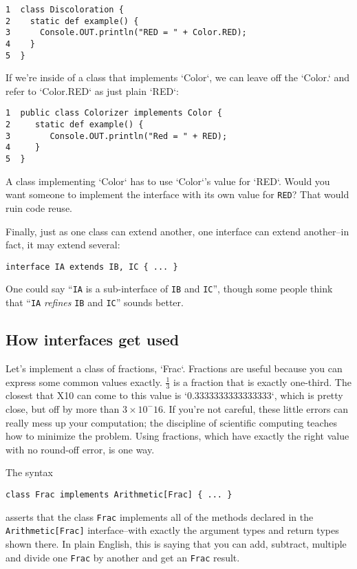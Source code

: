 \begin{description}
\begin{verbatim}
1  class Discoloration {
2    static def example() {
3      Console.OUT.println("RED = " + Color.RED);
4    }
5  }
\end{verbatim}

If we're inside of a class that implements \xcd`Color`, we can leave off the
\xcd`Color.` and refer to \xcd`Color.RED` as just plain \xcd`RED`:

\begin{verbatim}
1  public class Colorizer implements Color {
2     static def example() {
3        Console.OUT.println("Red = " + RED); 
4     }
5  }
\end{verbatim}

A class implementing \xcd`Color` has to use \xcd`Color`'s value for \xcd`RED`.  
Would you 
want someone to implement the interface with its own value for {\tt RED}? That
would ruin code reuse. 


\end{description}

Finally, just as one class can extend another, one interface can extend another--in fact, it may
extend several:
\begin{verbatim}
interface IA extends IB, IC { ... }
\end{verbatim}
One could
say ``{\tt IA} is a sub-interface of {\tt IB} and {\tt IC}'', though some
people think that 
``{\tt IA} {\em refines} {\tt IB} and {\tt IC}'' sounds better. 

\subsection{How interfaces get used}

Let's implement a class of fractions, \xcd`Frac`.  Fractions are useful
because you can express some common values exactly.  {$\frac{1}{3}$} is a
fraction that is exactly one-third.  The 
closest that X10 can come to this value is 
\xcd`0.3333333333333333`, which is pretty close, but off by more than
{$3\times 10^-16$}.  If you're not careful, these little errors can really
mess up your computation; the discipline of scientific computing teaches how
to minimize the problem.  Using fractions, which have exactly the right value
with no round-off error, is one way.

The syntax 
\begin{verbatim}
class Frac implements Arithmetic[Frac] { ... }
\end{verbatim}
asserts that the class {\tt Frac} implements all of the methods 
declared in the {\tt Arith\-me\-tic[Frac]} interface--with exactly the 
argument types and return types shown there.
In plain English, this is saying that you can add, subtract, multiple and divide one
{\tt Frac} by another and get an {\tt Frac} result.


